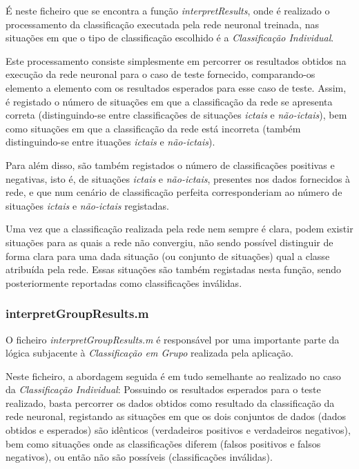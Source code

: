 \documentclass{article}
\begin{document}
É neste ficheiro que se encontra a função \emph{interpretResults}, onde é realizado o processamento da classificação executada pela rede neuronal treinada, nas situações em que o tipo de classificação escolhido é a \emph{Classificação Individual}.

Este processamento consiste simplesmente em percorrer os resultados obtidos na execução da rede neuronal para o caso de teste fornecido, comparando-os elemento a elemento com os resultados esperados para esse caso de teste. Assim, é registado o número de situações em que a classificação da rede se apresenta correta (distinguindo-se entre classificações de situações \emph{ictais} e \emph{não-ictais}), bem como situações em que a classificação da rede está incorreta (também distinguindo-se entre ituações \emph{ictais} e \emph{não-ictais}).

Para além disso, são também registados o número de classificações positivas e negativas, isto é, de situações \emph{ictais} e \emph{não-ictais}, presentes nos dados fornecidos à rede, e que num cenário de classificação perfeita corresponderiam ao número de situações \emph{ictais} e \emph{não-ictais} registadas.

Uma vez que a classificação realizada pela rede nem sempre é clara, podem existir situações para as quais a rede não convergiu, não sendo possível distinguir de forma clara para uma dada situação (ou conjunto de situações) qual a classe atribuída pela rede. Essas situações são também registadas nesta função, sendo posteriormente reportadas como classificações inválidas.

\subsubsection{interpretGroupResults.m}

O ficheiro \emph{interpretGroupResults.m} é responsável por uma importante parte da lógica subjacente à \emph{Classificação em Grupo} realizada pela aplicação.

Neste ficheiro, a abordagem seguida é em tudo semelhante ao realizado no caso da \emph{Classificação Individual}: Possuindo os resultados esperados para o teste realizado, basta percorrer os dados obtidos como resultado da classificação da rede neuronal, registando as situações em que os dois conjuntos de dados (dados obtidos e esperados) são idênticos (verdadeiros positivos e verdadeiros negativos), bem como situações onde as classificações diferem (falsos positivos e falsos negativos), ou então não são possíveis (classificações inválidas).
\end{document}
